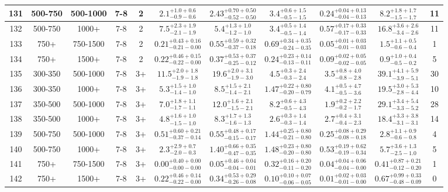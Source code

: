 \documentclass[11pt, oneside]{article}
\begin{document}
\begin{table}
{\begin{tabular}{ |c|c|c|c|c||c|c|c|c||c|c| }
131 & 500-750 & 500-1000 & 7-8 & 2 & $2.1^{+1.0+0.6}_{-0.9-0.6}$ & $2.43^{+0.70+0.50}_{-0.52-0.50}$ & $3.4^{+0.6+1.5}_{-0.5-1.5}$ & $0.24^{+0.04+0.13}_{-0.04-0.13}$ & $8.2^{+1.8+1.7}_{-1.5-1.7}$ & 11 \\ \hline
132 & 500-750 & 1000+ & 7-8 & 2 & $7.5^{+2.3+1.9}_{-2.1-1.9}$ & $5.4^{+1.3+1.0}_{-1.2-1.0}$ & $3.4^{+0.5+1.4}_{-0.5-1.4}$ & $0.57^{+0.17+0.33}_{-0.17-0.33}$ & $16.8^{+3.6+2.6}_{-3.4-2.6}$ & 11 \\ \hline
133 & 750+ & 750-1500 & 7-8 & 2 & $0.21^{+0.43+0.16}_{-0.21-0.00}$ & $0.55^{+0.59+0.32}_{-0.37-0.18}$ & $0.69^{+0.34+0.35}_{-0.24-0.35}$ & $0.05^{+0.01+0.03}_{-0.01-0.03}$ & $1.5^{+1.1+0.5}_{-0.6-0.4}$ & 1 \\ \hline
134 & 750+ & 1500+ & 7-8 & 2 & $0.22^{+0.46+0.15}_{-0.22-0.00}$ & $0.37^{+0.53+0.37}_{-0.25-0.12}$ & $0.24^{+0.23+0.14}_{-0.13-0.11}$ & $0.09^{+0.02+0.05}_{-0.02-0.05}$ & $0.9^{+1.0+0.4}_{-0.5-0.2}$ & 5 \\ \hline
135 & 300-350 & 500-1000 & 7-8 & 3+ & $11.5^{+2.0+1.8}_{-1.9-1.8}$ & $19.6^{+2.0+3.1}_{-1.9-3.0}$ & $4.5^{+0.3+2.4}_{-0.3-2.4}$ & $3.5^{+0.8+4.0}_{-0.8-2.8}$ & $39.1^{+4.1+5.9}_{-3.9-5.1}$ & 30 \\ \hline
136 & 300-350 & 1000+ & 7-8 & 3+ & $5.3^{+1.5+1.0}_{-1.4-1.0}$ & $8.5^{+1.5+2.1}_{-1.4-2.1}$ & $1.47^{+0.22+0.80}_{-0.20-0.79}$ & $4.1^{+0.5+4.7}_{-0.5-3.6}$ & $19.5^{+3.0+5.3}_{-2.8-4.4}$ & 10 \\ \hline
137 & 350-500 & 500-1000 & 7-8 & 3+ & $7.0^{+1.8+1.1}_{-1.7-1.1}$ & $12.0^{+1.6+2.1}_{-1.5-2.1}$ & $8.2^{+0.6+4.3}_{-0.5-4.3}$ & $1.9^{+0.2+2.2}_{-0.2-1.7}$ & $29.1^{+3.4+5.4}_{-3.3-5.2}$ & 28 \\ \hline
138 & 350-500 & 1000+ & 7-8 & 3+ & $4.8^{+1.6+1.0}_{-1.5-1.0}$ & $8.3^{+1.7+1.3}_{-1.6-1.3}$ & $2.6^{+0.3+1.4}_{-0.3-1.4}$ & $2.7^{+0.4+3.1}_{-0.4-2.3}$ & $18.4^{+3.3+3.8}_{-3.1-3.1}$ & 14 \\ \hline
139 & 500-750 & 500-1000 & 7-8 & 3+ & $0.51^{+0.60+0.21}_{-0.37-0.14}$ & $0.55^{+0.48+0.17}_{-0.15-0.17}$ & $1.44^{+0.25+0.80}_{-0.21-0.80}$ & $0.25^{+0.08+0.29}_{-0.08-0.18}$ & $2.8^{+1.1+0.9}_{-0.6-0.8}$ & 4 \\ \hline
140 & 500-750 & 1000+ & 7-8 & 3+ & $2.3^{+2.9+0.7}_{-2.0-0.3}$ & $1.40^{+0.66+0.35}_{-0.47-0.35}$ & $1.48^{+0.23+0.80}_{-0.20-0.80}$ & $0.53^{+0.19+0.62}_{-0.19-0.34}$ & $5.7^{+3.6+1.3}_{-2.5-1.0}$ & 5 \\ \hline
141 & 750+ & 750-1500 & 7-8 & 3+ & $0.00^{+0.40+0.00}_{-0.00-0.00}$ & $0.05^{+0.46+0.04}_{-0.04-0.01}$ & $0.32^{+0.16+0.20}_{-0.11-0.20}$ & $0.04^{+0.04+0.06}_{-0.04-0.00}$ & $0.41^{+0.87+0.21}_{-0.12-0.20}$ & 1 \\ \hline
142 & 750+ & 1500+ & 7-8 & 3+ & $0.22^{+0.46+0.14}_{-0.22-0.00}$ & $0.34^{+0.53+0.29}_{-0.26-0.08}$ & $0.10^{+0.10+0.07}_{-0.06-0.05}$ & $0.01^{+0.02+0.03}_{-0.01-0.00}$ & $0.67^{+0.99+0.33}_{-0.48-0.09}$ & 0 \\ \hline
\end{tabular}}
\end{table}
\end{document}

